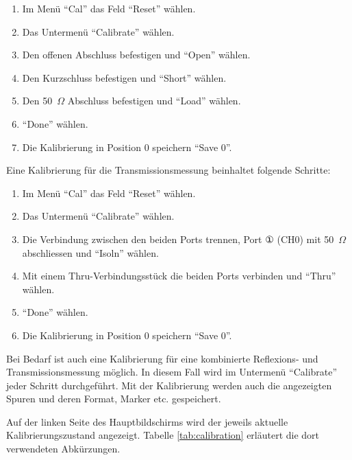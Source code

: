 \documentclass[twoside,a4paper,11pt,halfparskip,DIV=11,notitlepage]{scrartcl}
\newcommand{\Ohm}{$\Omega$\xspace}
\begin{document}
\begin{enumerate}
    \item Im Menü ``Cal'' das Feld ``Reset'' wählen.
    \item Das Untermenü ``Calibrate'' wählen.
    \item Den offenen Abschluss befestigen und ``Open'' wählen.
    \item Den Kurzschluss befestigen und ``Short'' wählen.
    \item Den 50~\Ohm Abschluss befestigen und ``Load'' wählen.
    \item ``Done'' wählen.
    \item Die Kalibrierung in Position 0 speichern ``Save 0''.
\end{enumerate}

Eine Kalibrierung für die Transmissionsmessung beinhaltet folgende Schritte:

\begin{enumerate}
    \item Im Menü ``Cal'' das Feld ``Reset'' wählen.
    \item Das Untermenü ``Calibrate'' wählen.
    \item Die Verbindung zwischen den beiden Ports trennen, Port ①  (CH0) mit 50~\Ohm abschliessen und ``Isoln'' wählen.
    \item Mit einem Thru-Verbindungsstück die beiden Ports verbinden und ``Thru'' wählen.
    \item ``Done'' wählen.
    \item Die Kalibrierung in Position 0 speichern ``Save 0''.
\end{enumerate}

Bei Bedarf ist auch eine Kalibrierung für eine kombinierte Reflexions- und Transmissionsmessung
möglich. In diesem Fall wird im Untermenü ``Calibrate'' jeder Schritt durchgeführt. Mit der
Kalibrierung werden auch die angezeigten Spuren und deren Format, Marker etc. gespeichert.

Auf der linken Seite des Hauptbildschirms wird der jeweils aktuelle Kalibrierungszustand
angezeigt. Tabelle \ref{tab:calibration} erläutert die dort verwendeten Abkürzungen.
\end{document}
